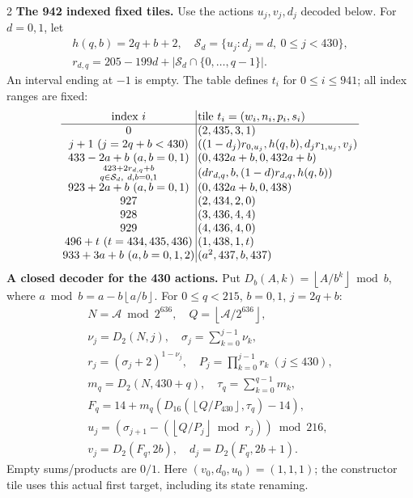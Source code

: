 \documentclass[10pt]{article}
\newcommand{\fl}[1]{\left\lfloor#1\right\rfloor}
\newcommand{\rg}[2]{\{#1,\ldots,#2\}}
\begin{document}
\begin{multicols}{2}
\textbf{The 942 indexed fixed tiles.}
Use the actions $u_j,v_j,d_j$ decoded below. For $d=0,1$, let
\[
\begin{gathered}
h(q,b)=2q+b+2,\quad
\mathcal S_d=\{u_j:d_j=d,\ 0\le j<430\},\\
r_{d,q}=205-199d+|\mathcal S_d\cap\rg0{q-1}|.
\end{gathered}
\]
An interval ending at $-1$ is empty. The table defines $t_i$ for
$0\le i\le941$; all index ranges are fixed:
\[
\setlength{\arraycolsep}{1.4pt}\begin{array}{c|l}
\text{index }i&\text{tile }t_i=(w_i,n_i,p_i,s_i)\\\hline
0&(2,435,3,1)\\
j+1\ (j=2q+b<430)&((1-d_j)r_{0,u_j},h(q,b),d_jr_{1,u_j},v_j)\\
433-2a+b\ (a,b=0,1)&(0,432a+b,0,432a+b)\\
\substack{423+2r_{d,q}+b\\q\in\mathcal S_d,\ d,b=0,1}&(dr_{d,q},b,(1-d)r_{d,q},h(q,b))\\
923+2a+b\ (a,b=0,1)&(0,432a+b,0,438)\\
927&(2,434,2,0)\\
928&(3,436,4,4)\\
929&(4,436,4,0)\\
496+t\ (t=434,435,436)&(1,438,1,t)\\
933+3a+b\ (a,b=0,1,2)&(a^2,437,b,437)
\end{array}
\]
\textbf{A closed decoder for the 430 actions.}
Put $D_b(A,k)=\fl{A/b^k}\bmod b$, where
$a\bmod b=a-b\fl{a/b}$. For $0\le q<215$, $b=0,1$, $j=2q+b$:
\[
\begin{gathered}
N=\mathcal A\bmod2^{636},\quad Q=\fl{\mathcal A/2^{636}},\\
\nu_j=D_2(N,j),\quad \sigma_j=\sum_{k=0}^{j-1}\nu_k,\\
r_j=(\sigma_j+2)^{1-\nu_j},\quad P_j=\prod_{k=0}^{j-1}r_k\ (j\le430),\\
m_q=D_2(N,430+q),\quad \tau_q=\sum_{k=0}^{q-1}m_k,\\
F_q=14+m_q(D_{16}(\fl{Q/P_{430}},\tau_q)-14),\\
u_j=(\sigma_{j+1}-(\fl{Q/P_j}\bmod r_j))\bmod216,\\
v_j=D_2(F_q,2b),\quad d_j=D_2(F_q,2b+1).
\end{gathered}
\]
Empty sums/products are $0/1$. Here $(v_0,d_0,u_0)=(1,1,1)$; the constructor tile
uses this actual first target, including its state renaming.


\end{multicols}
\end{document}
